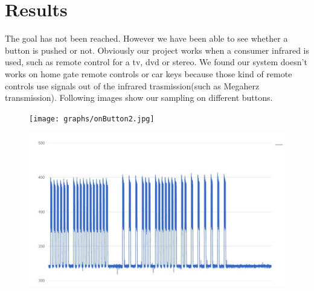 \section{Results}

The goal has not been reached. However we have been able to see whether a button is pushed or not.
Obviously our project works when a consumer infrared is used, such as remote control for a tv, dvd or stereo. 
We found our system doesn't works on home gate remote controls or car keys because those kind of remote controls use signals out of the infrared trasmission(such as Megaherz transmission).
Following images show our sampling on different buttons.

\begin{figure}[h]
	\centering
	\texttt{[image: graphs/onButton2.jpg]}%
\end{figure}

\begin{figure}[h]
	\centering
	\includegraphics[scale=0.6]{graphs/1Button.jpg}%
\end{figure}

